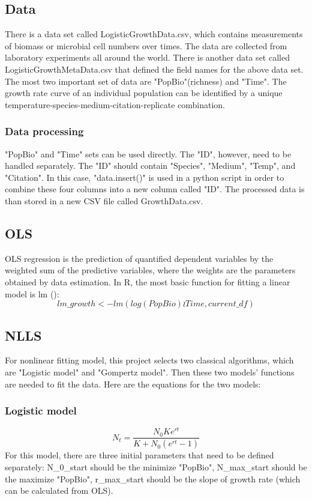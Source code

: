 \documentclass[11pt]{article}
\begin{document}
    \subsection{Data}
    There is a data set called LogisticGrowthData.csv, which contains measurements of biomass or microbial cell numbers over times. The data are collected from laboratory experiments all around the world. There is another data set called LogisticGrowthMetaData.csv that defined the field names for the above data set. The most two important set of data are "PopBio"(richness) and "Time". The growth rate curve of an individual population can be identified by a unique temperature-species-medium-citation-replicate combination. 
        \subsubsection{Data processing}
        "PopBio" and "Time" sets can be used directly. The "ID", however, need to be handled separately. The "ID" should contain "Species", "Medium", "Temp", and "Citation". In this case, "data.insert()" is used in a python script in order to combine these four columns into a new column called "ID". The processed data is than stored in a new CSV file called GrowthData.csv. 
    \subsection{OLS}
    OLS regression is the prediction of quantified dependent variables by the weighted sum of the predictive variables, where the weights are the parameters obtained by data estimation. In R, the most basic function for fitting a linear model is lm ():
    \begin{equation}
        lm\_growth <- lm(log(PopBio)\wr Time,current\_df)
    \end{equation}
    \subsection{NLLS}
    For nonlinear fitting model, this project selects two classical algorithms, which are "Logistic model" and "Gompertz model". Then these two models' functions are needed to fit the data. Here are the equations for the two models:
        \subsubsection{Logistic model}
        \begin{equation}
            N_{t}=\frac{N_{0} Ke^{rt}}{K+N_{0}(e^{rt}-1)} 
        \end{equation}
        For this model, there are three initial parameters that need to be defined separately: N\_0\_start should be the minimize "PopBio", N\_max\_start should be the maximize "PopBio", r\_max\_start should be the slope of growth rate (which can be calculated from OLS). 
\end{document}

